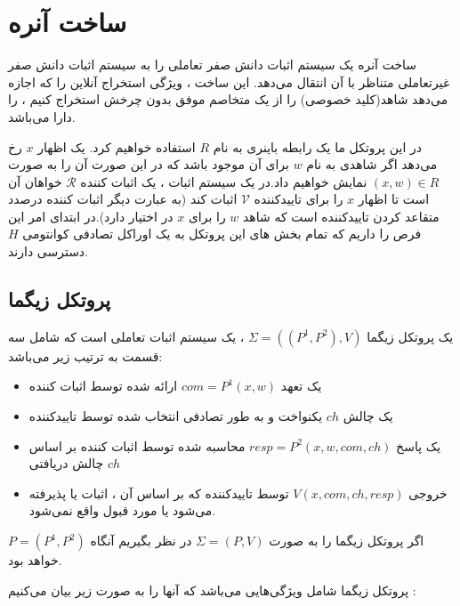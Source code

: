 \documentclass[12pt,a4paper]{article}
\begin{document}
\newpage
\section{ساخت آنره}\label{unruh}

ساخت آنره 
\cite{unruh}
یک سیستم اثبات دانش صفر تعاملی را به سیستم اثبات دانش صفر غیرتعاملی متناظر با آن انتقال می‌دهد. این ساخت ، ویژگی استخراج آنلاین
را که اجازه می‌دهد شاهد(کلید خصوصی) را از یک متخاصم موفق بدون چرخش
استخراج کنیم ، را دارا می‌باشد.

در این پروتکل ما یک رابطه باینری به نام 
$R$
استفاده خواهیم کرد. یک اظهار 
$x$
رخ می‌دهد اگر شاهدی به نام 
$w$
برای آن موجود باشد که در این صورت آن را به صورت 
$(x,w) \in R $
نمایش خواهیم داد.در یک سیستم اثبات ، یک اثبات کننده 
$\mathcal{R}$
خواهان آن است تا اظهار 
$x$
را برای تاییدکننده 
$\mathcal{V}$
اثبات کند (به عبارت دیگر اثبات کننده درصدد متقاعد کردن تاییدکننده است که شاهد 
$w$
را برای 
$x$
در اختیار دارد).در ابتدای امر این فرص را داریم که تمام بخش های این پروتکل به یک اوراکل تصادفی کوانتومی 
$H$
دسترسی دارند.

\subsection{پروتکل زیگما}\label{sigma}

یک پروتکل زیگما 
$\Sigma = ((P^1,P^2),V)$
، یک سیستم اثبات تعاملی است که شامل سه قسمت به ترتیب زیر می‌باشد:
\begin{itemize}
	\item 
	یک تعهد
	$com = P^1(x,w)$
	ارائه شده توسط اثبات کننده 
	\item 
	یک چالش 
	$ch$
	یکنواخت و به طور تصادفی انتخاب شده توسط تاییدکننده
	\item 
	یک پاسخ 
	$resp = P^2(x,w,com,ch)$
	محاسبه شده توسط اثبات کننده بر اساس چالش دریافتی 
	$ch$
	
	\item
	خروجی 
	$V(x,com,ch,resp)$
	توسط تاییدکننده که بر اساس آن ، اثبات یا پذیرفته می‌شود یا مورد قبول واقع نمی‌شود.
	
\end{itemize}

اگر پروتکل زیگما را به صورت 
$\Sigma = (P,V)$
در نظر بگیریم آنگاه  
$P = (P^1,P^2)$
خواهد بود.

پروتکل زیگما شامل ویژگی‌هایی می‌باشد که آنها را به صورت زیر بیان می‌کنیم :
\end{document}
